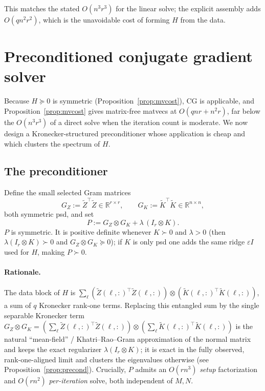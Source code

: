 \documentclass[12pt]{article}
\newcommand{\bR}{\mathbb{R}}
\newcommand{\tZ}{\tilde Z}
\newcommand{\tK}{\tilde K}
\theoremstyle{definition}
\begin{document}
This matches the stated $O(n^3 r^3)$ for the linear solve; the explicit assembly
adds $O(qn^2r^2)$, which is the unavoidable cost of forming $H$ from the data.

\section{Preconditioned conjugate gradient solver}

Because $H\succeq0$ is symmetric (Proposition~\ref{prop:mvcost}), CG is applicable,
and Proposition~\ref{prop:mvcost} gives matrix-free matvecs at
$O(qnr+n^2r)$, far below the $O(n^3r^3)$ of a direct solve when the iteration count
is moderate. We now design a Kronecker-structured preconditioner whose application
is cheap and which clusters the spectrum of $H$.

\subsection{The preconditioner}

Define the small selected Gram matrices
\begin{equation}\label{eq:grams}
G_Z:=\tZ^\top\tZ\in\bR^{r\times r},\qquad
G_K:=\tK^\top\tK\in\bR^{n\times n},
\end{equation}
both symmetric psd, and set
\begin{equation}\label{eq:Pdef}
P:=G_Z\otimes G_K+\lambda\,(I_r\otimes K).
\end{equation}
$P$ is symmetric. It is positive definite whenever $K\succ0$ and $\lambda>0$
(then $\lambda(I_r\otimes K)\succ0$ and $G_Z\otimes G_K\succeq0$); if $K$ is only
psd one adds the same ridge $\varepsilon I$ used for $H$, making $P\succ0$.

\paragraph{Rationale.}
The data block of $H$ is $\sum_\ell(\tZ(\ell,:)^\top\tZ(\ell,:))\otimes
(\tK(\ell,:)^\top\tK(\ell,:))$, a sum of $q$ Kronecker rank-one terms. Replacing
this entangled sum by the single separable Kronecker term $G_Z\otimes G_K=
(\sum_\ell\tZ(\ell,:)^\top\tZ(\ell,:))\otimes(\sum_\ell\tK(\ell,:)^\top\tK(\ell,:))$
is the natural ``mean-field'' / Khatri--Rao--Gram approximation of the normal
matrix and keeps the exact regularizer $\lambda(I_r\otimes K)$; it is exact in the
fully observed, rank-one-aligned limit and clusters the eigenvalues otherwise (see
Proposition~\ref{prop:precond}). Crucially, $P$ admits an $O(rn^3)$ \emph{setup}
factorization and $O(rn^2)$ \emph{per-iteration} solve, both independent of $M,N$.
\end{document}
